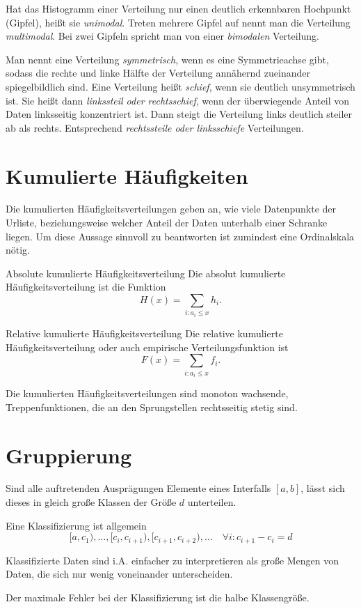 Hat das Histogramm einer Verteilung nur einen deutlich erkennbaren Hochpunkt (Gipfel), heißt sie \emph{unimodal}. Treten mehrere Gipfel auf nennt man die Verteilung \emph{multimodal}. Bei zwei Gipfeln spricht man von einer \emph{bimodalen} Verteilung.

Man nennt eine Verteilung \emph{symmetrisch}, wenn es eine Symmetrieachse gibt, sodass die rechte und linke Hälfte der Verteilung annähernd zueinander spiegelbildlich sind. 
Eine Verteilung heißt \emph{schief}, wenn sie deutlich unsymmetrisch ist. Sie heißt dann \emph{linkssteil oder rechtsschief}, wenn der überwiegende Anteil von Daten linksseitig konzentriert ist. Dann steigt die Verteilung links deutlich steiler ab als rechts. Entsprechend \emph{rechtssteile oder linksschiefe} Verteilungen.


\section{Kumulierte Häufigkeiten}
Die kumulierten Häufigkeitsverteilungen geben an, wie viele Datenpunkte der Urliste, beziehungsweise welcher Anteil der Daten unterhalb einer Schranke liegen. Um diese Aussage sinnvoll zu beantworten ist zumindest eine Ordinalskala nötig.

\begin{definition}{Absolute kumulierte Häufigkeitsverteilung}
	Die absolut kumulierte Häufigkeitsverteilung ist die Funktion
	\begin{equation*}
		H(x)=\sum\limits_{i:a_i\leq x} h_i.
	\end{equation*}
\end{definition}
\begin{definition}{Relative kumulierte Häufigkeitsverteilung}
	Die relative kumulierte Häufigkeitsverteilung oder auch empirische Verteilungsfunktion ist
	\begin{equation*}
		F(x)=\sum\limits_{i:a_i\leq x} f_i.
	\end{equation*}
\end{definition}
Die kumulierten Häufigkeitsverteilungen sind monoton wachsende, Treppenfunktionen, die an den Sprungstellen rechtsseitig stetig sind.



\section{Gruppierung}
Sind alle auftretenden Ausprägungen Elemente eines Interfalls $[a,b]$, lässt sich dieses in gleich große Klassen der Größe $d$ unterteilen.

Eine Klassifizierung ist allgemein
\begin{equation*}
	[a, c_1), \ldots, [c_i,c_{i+1}), [c_{i+1},c_{i+2}), \ldots\quad \forall i: c_{i+1}-c_i=d
\end{equation*}

Klassifizierte Daten sind i.A. einfacher zu interpretieren als große Mengen von Daten, die sich nur wenig voneinander unterscheiden.

Der maximale Fehler bei der Klassifizierung ist die halbe Klassengröße.





